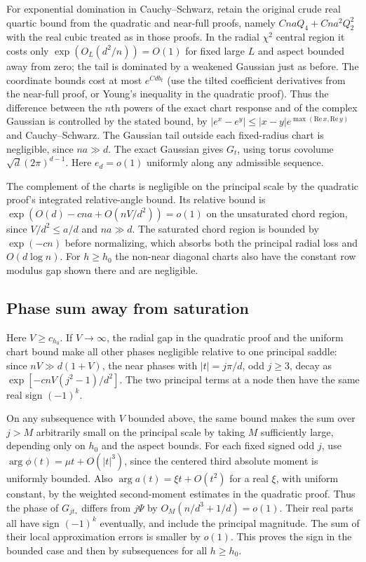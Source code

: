 For exponential domination in Cauchy--Schwarz, retain the original crude real quartic bound from the quadratic and near-full proofs, namely $CnaQ_4+Cna^2Q_2^2$ with the real cubic treated as in those proofs. In the radial $\chi^2$ central region it costs only $\exp(O_L(d^2/n))=O(1)$ for fixed large $L$ and aspect bounded away from zero; the tail is dominated by a weakened Gaussian just as before. The coordinate bounds cost at most $e^{C d b_t}$ (use the tilted coefficient derivatives from the near-full proof, or Young's inequality in the quadratic proof). Thus the difference between the $n$th powers of the exact chart response and of the complex Gaussian is controlled by the stated bound, by $|e^x-e^y|\le |x-y|e^{\max(\mathrm{Re}\,x,\mathrm{Re}\,y)}$ and Cauchy--Schwarz. The Gaussian tail outside each fixed-radius chart is negligible, since $na\gg d$. The exact Gaussian gives $G_t$, using torus covolume $\sqrt d(2\pi)^{d-1}$. Here $e_d=o(1)$ uniformly along any admissible sequence.

The complement of the charts is negligible on the principal scale by the quadratic proof's integrated relative-angle bound. Its relative bound is $\exp(O(d)-cna+O(nV/d^2))=o(1)$ on the unsaturated chord region, since $V/d^2\le a/d$ and $na\gg d$. The saturated chord region is bounded by $\exp(-cn)$ before normalizing, which absorbs both the principal radial loss and $O(d\log n)$. For $h\ge h_0$ the non-near diagonal charts also have the constant row modulus gap shown there and are negligible.

\subsection{Phase sum away from saturation}

Here $V\ge c_{h_0}$. If $V\to\infty$, the radial gap in the quadratic proof and the uniform chart bound make all other phases negligible relative to one principal saddle: since $nV\gg d(1+V)$, the near phases with $|t|=j\pi/d$, odd $j\ge3$, decay as $\exp[-c nV(j^2-1)/d^2]$. The two principal terms at a node then have the same real sign $(-1)^k$.

On any subsequence with $V$ bounded above, the same bound makes the sum over $j>M$ arbitrarily small on the principal scale by taking $M$ sufficiently large, depending only on $h_0$ and the aspect bounds. For each fixed signed odd $j$, use
$\arg\phi(t)=\mu t+O(|t|^3)$, since the centered third absolute moment is uniformly bounded. Also $\arg a(t)=\xi t+O(t^2)$ for a real $\xi$, with uniform constant, by the weighted second-moment estimates in the quadratic proof. Thus the phase of $G_{j t_*}$ differs from $j\Psi$ by $O_M(n/d^3+1/d)=o(1)$. Their real parts all have sign $(-1)^k$ eventually, and include the principal magnitude. The sum of their local approximation errors is smaller by $o(1)$. This proves the sign in the bounded case and then by subsequences for all $h\ge h_0$.

